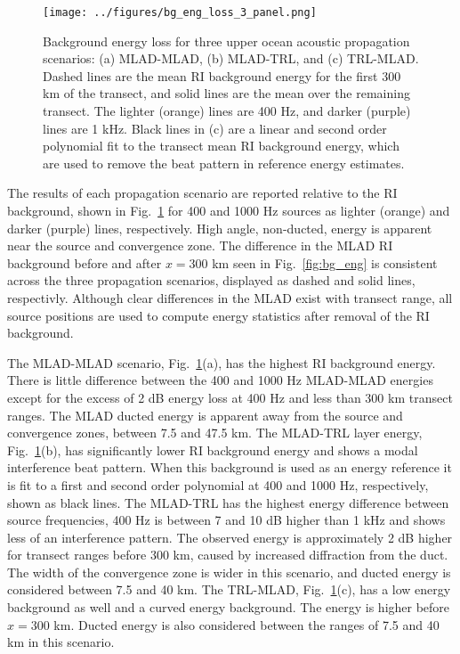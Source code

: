 \documentclass[preprint,NumberedRefs]{JASA}
\begin{document}
\begin{figure}
\texttt{[image: ../figures/bg\_eng\_loss\_3\_panel.png]}
        \caption{Background energy loss for three upper ocean acoustic propagation scenarios: (a) MLAD-MLAD, (b) MLAD-TRL, and (c) TRL-MLAD. Dashed lines are the mean RI background energy for the first 300 km of the transect, and solid lines are the mean over the remaining transect. The lighter (orange) lines are 400 Hz, and darker (purple) lines are 1 kHz. Black lines in (c) are a linear and second order polynomial fit to the transect mean RI background energy, which are used to remove the beat pattern in reference energy estimates.}
    \label{fig:eng_bg_3}
\end{figure}

The results of each propagation scenario are reported relative to the RI background, shown in Fig.~\ref{fig:eng_bg_3} for 400 and 1000 Hz sources as lighter (orange) and darker (purple) lines, respectively. High angle, non-ducted, energy is apparent near the source and convergence zone. The difference in the MLAD RI background before and after $x=300$ km seen in Fig.~\ref{fig:bg_eng} is consistent across the three propagation scenarios, displayed as dashed and solid lines, respectivly. Although clear differences in the MLAD exist with transect range, all source positions are used to compute energy statistics after removal of the RI background.

The MLAD-MLAD scenario, Fig.~\ref{fig:eng_bg_3}(a), has the highest RI background energy. There is little difference between the 400 and 1000 Hz MLAD-MLAD energies except for the excess of 2 dB energy loss at 400 Hz and less than 300 km transect ranges. The MLAD ducted energy is apparent away from the source and convergence zones, between 7.5 and 47.5 km. The MLAD-TRL layer energy, Fig.~\ref{fig:eng_bg_3}(b), has significantly lower RI background energy and shows a modal interference beat pattern. When this background is used as an energy reference it is fit to a first and second order polynomial at 400 and 1000 Hz, respectively, shown as black lines. The MLAD-TRL has the highest energy difference between source frequencies, 400 Hz is between 7 and 10 dB higher than 1 kHz and shows less of an interference pattern. The observed energy is approximately 2 dB higher for transect ranges before 300 km, caused by increased diffraction from the duct. The width of the convergence zone is wider in this scenario, and ducted energy is considered between 7.5 and 40 km. The TRL-MLAD, Fig.~\ref{fig:eng_bg_3}(c), has a low energy background as well and a curved energy background. The energy is higher before $x=300$ km. Ducted energy is also considered between the ranges of 7.5 and 40 km in this scenario.
\end{document}
